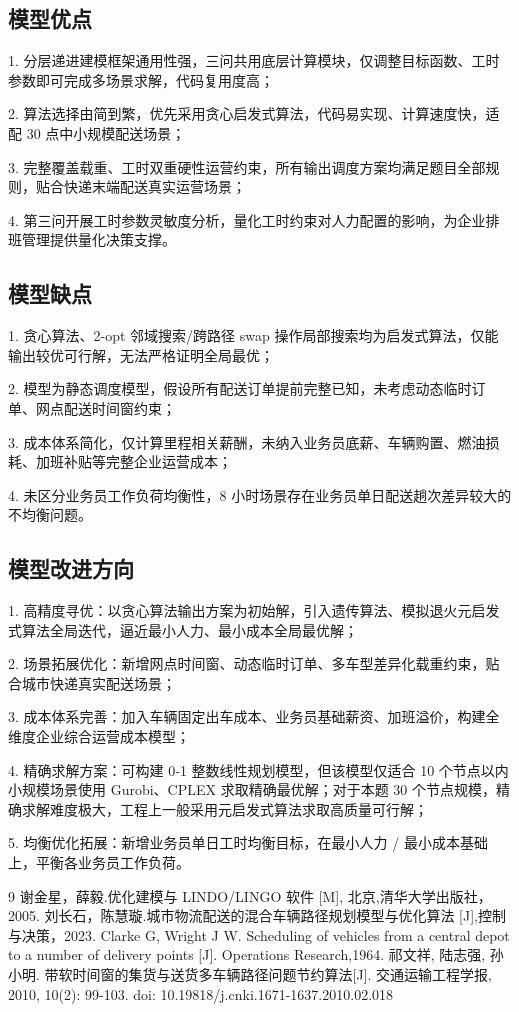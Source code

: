 \documentclass[withoutpreface,bwprint]{cumcmthesis} %
\begin{document}
\subsection{模型优点}
1.	分层递进建模框架通用性强，三问共用底层计算模块，仅调整目标函数、工时参数即可完成多场景求解，代码复用度高；
\par2.	算法选择由简到繁，优先采用贪心启发式算法，代码易实现、计算速度快，适配 30 点中小规模配送场景；
\par3.	完整覆盖载重、工时双重硬性运营约束，所有输出调度方案均满足题目全部规则，贴合快递末端配送真实运营场景；
\par4.	第三问开展工时参数灵敏度分析，量化工时约束对人力配置的影响，为企业排班管理提供量化决策支撑。

\subsection{模型缺点}
1.	贪心算法、2-opt 邻域搜索/跨路径 swap 操作局部搜索均为启发式算法，仅能输出较优可行解，无法严格证明全局最优；
\par 2.	模型为静态调度模型，假设所有配送订单提前完整已知，未考虑动态临时订单、网点配送时间窗约束；
\par 3.	成本体系简化，仅计算里程相关薪酬，未纳入业务员底薪、车辆购置、燃油损耗、加班补贴等完整企业运营成本；
\par 4.	未区分业务员工作负荷均衡性，8 小时场景存在业务员单日配送趟次差异较大的不均衡问题。

\subsection{模型改进方向}
1.	高精度寻优：以贪心算法输出方案为初始解，引入遗传算法、模拟退火元启发式算法全局迭代，逼近最小人力、最小成本全局最优解；
\par 2.	场景拓展优化：新增网点时间窗、动态临时订单、多车型差异化载重约束，贴合城市快递真实配送场景；
\par 3.	成本体系完善：加入车辆固定出车成本、业务员基础薪资、加班溢价，构建全维度企业综合运营成本模型；
\par 4.	精确求解方案：可构建 0‑1 整数线性规划模型，但该模型仅适合 10 个节点以内小规模场景使用 Gurobi、CPLEX 求取精确最优解；对于本题 30 个节点规模，精确求解难度极大，工程上一般采用元启发式算法求取高质量可行解；
\par 5.	均衡优化拓展：新增业务员单日工时均衡目标，在最小人力 / 最小成本基础上，平衡各业务员工作负荷。




\begin{thebibliography}{9}%
    谢金星，薛毅.优化建模与 LINDO/LINGO 软件 [M], 北京,清华大学出版社，2005.
    刘长石，陈慧璇.城市物流配送的混合车辆路径规划模型与优化算法 [J],控制与决策，2023.
    Clarke G, Wright J W. Scheduling of vehicles from a central depot to a number of delivery points [J]. Operations Research,1964.
    祁文祥, 陆志强, 孙小明. 带软时间窗的集货与送货多车辆路径问题节约算法[J]. 交通运输工程学报, 2010, 10(2): 99-103. doi: 10.19818/j.cnki.1671-1637.2010.02.018
\end{thebibliography}
\end{document}

